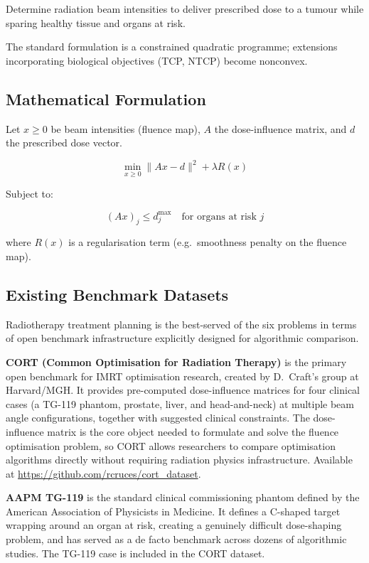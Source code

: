 \documentclass[11pt]{article}
\begin{document}
Determine radiation beam intensities to deliver prescribed dose to a tumour while
sparing healthy tissue and organs at risk.

The standard formulation is a constrained quadratic programme; extensions
incorporating biological objectives (TCP, NTCP) become nonconvex.

\subsection*{Mathematical Formulation}

Let $x \ge 0$ be beam intensities (fluence map), $A$ the dose-influence matrix,
and $d$ the prescribed dose vector.

\[
\min_{x \ge 0}
\| A x - d \|^2 + \lambda R(x)
\]

Subject to:

\[
(Ax)_j \le d^{\text{max}}_j \quad \text{for organs at risk } j
\]

where $R(x)$ is a regularisation term (e.g.\ smoothness penalty on the fluence map).

\subsection*{Existing Benchmark Datasets}

Radiotherapy treatment planning is the best-served of the six problems in terms of
open benchmark infrastructure explicitly designed for algorithmic comparison.

\textbf{CORT (Common Optimisation for Radiation Therapy)} \cite{Craft2014} is the primary
open benchmark for IMRT optimisation research, created by D.~Craft's group at Harvard/MGH.
It provides pre-computed dose-influence matrices for four clinical cases (a TG-119 phantom,
prostate, liver, and head-and-neck) at multiple beam angle configurations, together with
suggested clinical constraints. The dose-influence matrix is the core object needed to
formulate and solve the fluence optimisation problem, so CORT allows researchers to
compare optimisation algorithms directly without requiring radiation physics infrastructure.
Available at \url{https://github.com/rcruces/cort_dataset}.

\textbf{AAPM TG-119} \cite{Ezzell2009} is the standard clinical commissioning phantom
defined by the American Association of Physicists in Medicine. It defines a C-shaped
target wrapping around an organ at risk, creating a genuinely difficult dose-shaping
problem, and has served as a de facto benchmark across dozens of algorithmic studies.
The TG-119 case is included in the CORT dataset.
\end{document}
